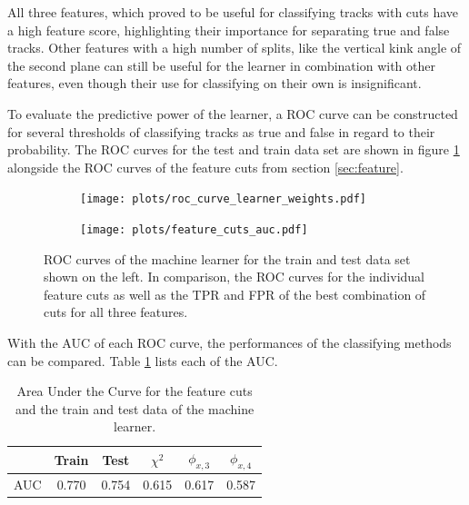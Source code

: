 All three features, which proved to be useful for classifying tracks with cuts have a high feature score, highlighting their importance for separating true and false tracks.
Other features with a high number of splits, like the vertical kink angle of the second plane can still be useful for the learner in combination with other features, even though
their use for classifying on their own is insignificant.

To evaluate the predictive power of the learner, a ROC curve can be constructed for several thresholds of classifying tracks as true and false in regard to
their probability. The ROC curves for the test and train data set are shown in figure \ref{fig:auc_comparison} alongside the ROC curves of the feature cuts from section \ref{sec:feature}.


\begin{figure}
  \hspace{-2.5cm}
  \begin{subfigure}{0.62\textwidth}
      \centering
      \texttt{[image: plots/roc\_curve\_learner\_weights.pdf]}
  \end{subfigure}
  \begin{subfigure}{0.62\textwidth}
      \hspace{0.95cm}
      \texttt{[image: plots/feature\_cuts\_auc.pdf]}
  \end{subfigure}
  \caption{ROC curves of the machine learner for the train and test data set shown on the left. In comparison, the ROC curves for the individual feature cuts as well as the
  TPR and FPR of the best combination of cuts for all three features.}
  \label{fig:auc_comparison}
\end{figure}

With the AUC of each ROC curve, the performances of the classifying methods can be compared. Table \ref{tab:AUC} lists each of the AUC.

\begin{table}
  \centering
  \begin{tabular}{c | c c c c c}
    \toprule
      & Train & Test & $\chi^2$ & $\phi_{x,3}$ & $\phi_{x,4}$\\
    \midrule
    AUC & 0.770 & 0.754 & 0.615 & 0.617 & 0.587 \\
  \end{tabular}
  \caption{Area Under the Curve for the feature cuts and the train and test data of the machine learner.}
  \label{tab:AUC}
\end{table}

